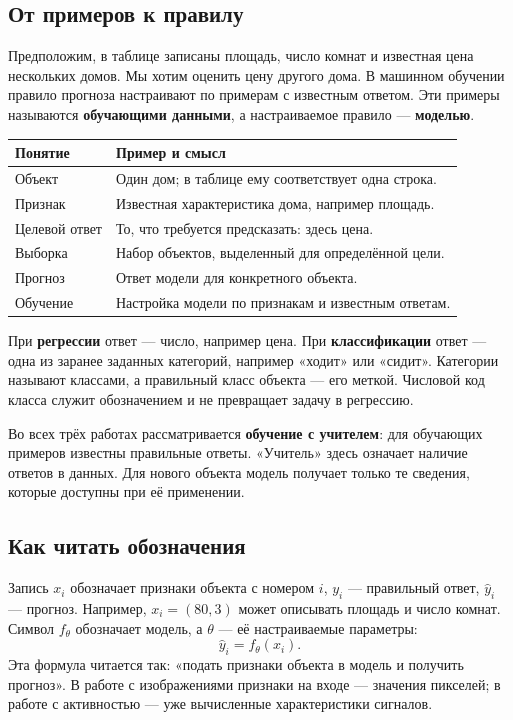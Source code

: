 \label{sec:first-steps}
\subsection*{От примеров к правилу}
Предположим, в таблице записаны площадь, число комнат и известная цена нескольких домов. Мы хотим оценить цену другого дома. В машинном обучении правило прогноза настраивают по примерам с известным ответом. Эти примеры называются \textbf{обучающими данными}, а настраиваемое правило --- \textbf{моделью}.

\begin{table}[H]\centering\small
\begin{tabularx}{\textwidth}{@{}p{}Y@{}}
\toprule
Понятие & Пример и смысл \\
\midrule
Объект & Один дом; в таблице ему соответствует одна строка. \\
Признак & Известная характеристика дома, например площадь. \\
Целевой ответ & То, что требуется предсказать: здесь цена. \\
Выборка & Набор объектов, выделенный для определённой цели. \\
Прогноз & Ответ модели для конкретного объекта. \\
Обучение & Настройка модели по признакам и известным ответам. \\
\bottomrule
\end{tabularx}
\end{table}

При \textbf{регрессии} ответ --- число, например цена. При \textbf{классификации} ответ --- одна из заранее заданных категорий, например «ходит» или «сидит». Категории называют классами, а правильный класс объекта --- его меткой. Числовой код класса служит обозначением и не превращает задачу в регрессию.

Во всех трёх работах рассматривается \textbf{обучение с учителем}: для обучающих примеров известны правильные ответы. «Учитель» здесь означает наличие ответов в данных. Для нового объекта модель получает только те сведения, которые доступны при её применении.

\subsection*{Как читать обозначения}
Запись \(x_i\) обозначает признаки объекта с номером \(i\), \(y_i\) --- правильный ответ, \(\widehat y_i\) --- прогноз. Например, \(x_i=(80,3)\) может описывать площадь и число комнат. Символ \(f_\theta\) обозначает модель, а \(\theta\) --- её настраиваемые параметры:
\[
\widehat y_i=f_\theta(x_i).
\]
Эта формула читается так: «подать признаки объекта в модель и получить прогноз». В работе с изображениями признаки на входе --- значения пикселей; в работе с активностью --- уже вычисленные характеристики сигналов.

